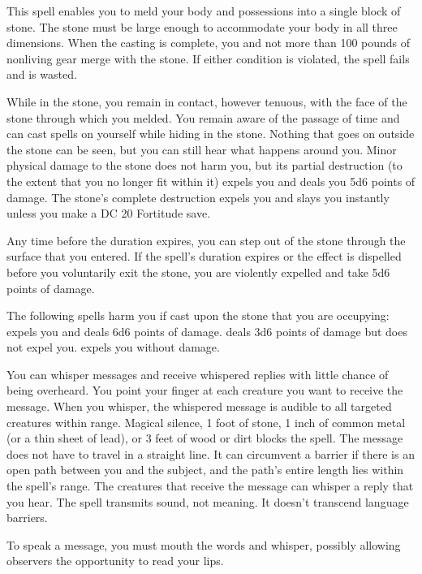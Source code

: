 \spelldur{\durlong}
\begin{spelleffect}
  This spell enables you to meld your body and possessions into a single block of stone. The stone must be large enough to accommodate your body in all three dimensions. When the casting is complete, you and not more than 100 pounds of nonliving gear merge with the stone. If either condition is violated, the spell fails and is wasted.
  \par While in the stone, you remain in contact, however tenuous, with the face of the stone through which you melded. You remain aware of the passage of time and can cast spells on yourself while hiding in the stone. Nothing that goes on outside the stone can be seen, but you can still hear what happens around you. Minor physical damage to the stone does not harm you, but its partial destruction (to the extent that you no longer fit within it) expels you and deals you 5d6 points of damage. The stone's complete destruction expels you and slays you instantly unless you make a DC 20 Fortitude save.
  \par Any time before the duration expires, you can step out of the stone through the surface that you entered. If the spell's duration expires or the effect is dispelled before you voluntarily exit the stone, you are violently expelled and take 5d6 points of damage.
\end{spelleffect}
\begin{spellnotes}
  The following spells harm you if cast upon the stone that you are occupying:  expels you and deals 6d6 points of damage.  deals 3d6 points of damage but does not expel you.  expels you without damage.
\end{spellnotes}

\spellrng{\rngmed}
\spelldur{\durlong}
\begin{spelleffect}
  You can whisper messages and receive whispered replies with little chance of being overheard. You point your finger at each creature you want to receive the message. When you whisper, the whispered message is audible to all targeted creatures within range. Magical silence, 1 foot of stone, 1 inch of common metal (or a thin sheet of lead), or 3 feet of wood or dirt blocks the spell. The message does not have to travel in a straight line. It can circumvent a barrier if there is an open path between you and the subject, and the path's entire length lies within the spell's range. The creatures that receive the message can whisper a reply that you hear. The spell transmits sound, not meaning. It doesn't transcend language barriers.
\end{spelleffect}
\begin{spellnotes}
  To speak a message, you must mouth the words and whisper, possibly allowing observers the opportunity to read your lips.
\end{spellnotes}

